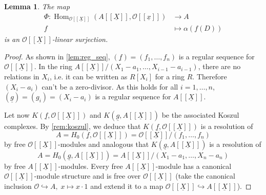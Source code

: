 \documentclass{article}
\theoremstyle{plain}%
\newtheorem{lemma}[theorem]{Lemma}
\theoremstyle{definition}
\theoremstyle{remark}
\renewcommand{\hom}{\operatorname{Hom}}
\begin{document}
\begin{lemma}\textup{\cite[see][lemma 5.14]{Darmon1995}}\label{lem:surjectivity}
    The map
    \begin{align*}
        \Phi\colon \hom_{\mathcal{O}[[\underline{X}]]}(A[[\underline{X}]], \mathcal{O}[[\underline{x}]]) &\to A\\
        f &\mapsto \alpha(f(D))
    \end{align*}
    is an \(\mathcal{O}[[\underline{X}]]\)-linear surjection.
\end{lemma}
\begin{proof}
    As shown in \cref{lem:reg_seq}, \((\underline{f}) = (f_1, \dots, f_n)\) 
    is a regular sequence for \(\mathcal{O}[[\underline{X}]]\).
    In the ring \(A[[\underline{X}]]/(X_1 - a_1, \dots, X_{i-1} - a_{i-1})\), there are no relations in \(X_i\),
    i.e. it can be written as \(R[X_i]\) for a ring \(R\). Therefore \((X_i - a_i)\) can't be a zero-divisor.
    As this holds for all \(i = 1, \dots, n\), \((\underline{g}) = (g_i) = (X_i - a_i)\) is a regular sequence 
    for \(A[[\underline{X}]]\).
    
    Let now \(K(\underline{f}, \mathcal{O}[[\underline{X}]])\) and \(K(\underline{g}, A[[\underline{X}]])\)
    be the associated Koszul complexes. 
    By \cref{rem:koszul}, we deduce that \(K(\underline{f}, \mathcal{O}[[\underline{X}]])\) is a resolution of 
    \[
        A = H_0(\underline{f}, \mathcal{O}[[\underline{X}]]) = \mathcal{O}[[\underline{X}]]/(f_1, \dots, f_n)
    \]
    by free \(\mathcal{O}[[\underline{X}]]\)-modules
    and analogous that \(K(\underline{g}, A[[\underline{X}]])\) is a resolution of
    \[
        A = H_0(\underline{g}, A[[\underline{X}]]) = A[[\underline{X}]]/(X_1 - a_1, \dots, X_n-a_n)
    \]
    by free \(A[[\underline{X}]]\)-modules.
    Every free \(A[[\underline{X}]]\)-module has a canonical \(\mathcal{O}[[\underline{X}]]\)-module structure 
    and is free over \(\mathcal{O}[[\underline{X}]]\)
    (take the canonical inclusion \(\mathcal{O} \hookrightarrow A,\; x \mapsto x\cdot 1\) and extend it to a map
    \(\mathcal{O}[[\underline{X}]] \hookrightarrow A[[\underline{X}]]\)).


\end{proof}
\end{document}
